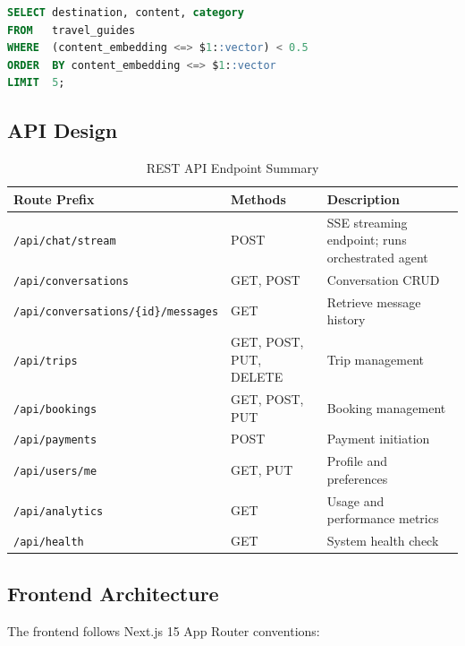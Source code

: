 \documentclass[12pt, a4paper]{article}
\newcommand{\api}[1]{\texttt{#1}}
\begin{document}
\begin{lstlisting}[language=SQL, caption=Semantic Destination Search via pgvector]
SELECT destination, content, category
FROM   travel_guides
WHERE  (content_embedding <=> $1::vector) < 0.5
ORDER  BY content_embedding <=> $1::vector
LIMIT  5;
\end{lstlisting}

\subsection{API Design}

\begin{table}[H]
\centering
\renewcommand{\arraystretch}{1.3}
\begin{tabularx}{\textwidth}{|l|l|X|}
  \hline
  \textbf{Route Prefix} & \textbf{Methods} & \textbf{Description} \\
  \hline
  \api{/api/chat/stream}                    & POST       & SSE streaming endpoint; runs orchestrated agent \\
  \hline
  \api{/api/conversations}                   & GET, POST  & Conversation CRUD \\
  \hline
  \api{/api/conversations/\{id\}/messages}   & GET        & Retrieve message history \\
  \hline
  \api{/api/trips}                           & GET, POST, PUT, DELETE & Trip management \\
  \hline
  \api{/api/bookings}                        & GET, POST, PUT & Booking management \\
  \hline
  \api{/api/payments}                        & POST       & Payment initiation \\
  \hline
  \api{/api/users/me}                        & GET, PUT   & Profile and preferences \\
  \hline
  \api{/api/analytics}                       & GET        & Usage and performance metrics \\
  \hline
  \api{/api/health}                          & GET        & System health check \\
  \hline
\end{tabularx}
\caption{REST API Endpoint Summary}
\end{table}

\subsection{Frontend Architecture}

The frontend follows Next.js 15 App Router conventions:
\end{document}
